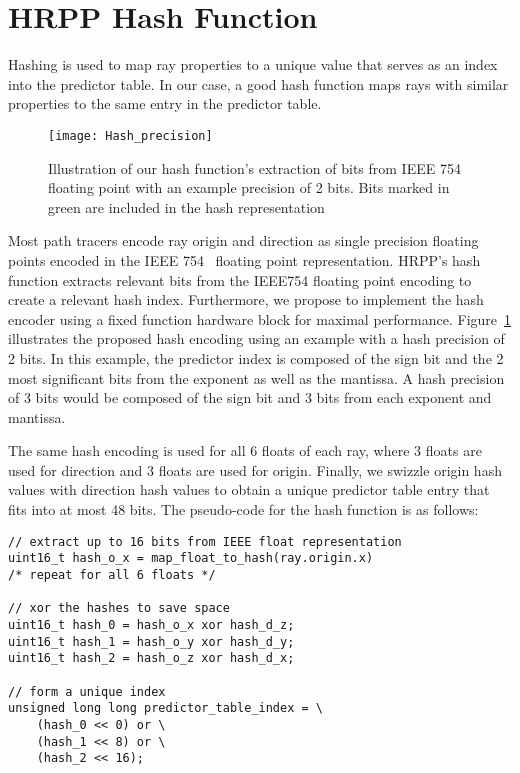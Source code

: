 
\section{HRPP Hash Function} \label{hash}
Hashing is used to map ray properties to a unique value that serves as an index into the predictor table. In our case, a good hash function maps rays with similar properties to the same entry in the predictor table.

\begin{figure}[htb]
  \centering
  \texttt{[image: Hash\_precision]}
 
  \caption{\label{fig:IEEEmapping}
           Illustration of our hash function's extraction of bits from IEEE 754 floating point with an example precision of 2 bits. Bits marked in green are included in the hash representation}
\end{figure}

Most path tracers encode ray origin and direction as single precision floating points encoded in the IEEE 754~\cite{1985--ieee754} floating point representation. HRPP's hash function extracts relevant bits from the IEEE754 floating point encoding to create a relevant hash index. 
Furthermore, we propose to implement the hash encoder using a fixed function hardware block for maximal performance. Figure~\ref{fig:IEEEmapping} illustrates the proposed hash encoding using an example with a hash precision of 2 bits. In this example, the predictor index is composed of the sign bit and the 2 most significant bits from the exponent as well as the mantissa. A hash precision of 3 bits would be composed of the sign bit and 3 bits from each exponent and mantissa. 

The same hash encoding is used for all 6 floats of each ray, where 3 floats are used for direction and 3 floats are used for origin. Finally, we swizzle origin hash values with direction hash values to obtain a unique predictor table entry that fits into at most 48 bits. The pseudo-code for the hash function is as follows:

\begin{verbatim}
// extract up to 16 bits from IEEE float representation 
uint16_t hash_o_x = map_float_to_hash(ray.origin.x)
/* repeat for all 6 floats */

// xor the hashes to save space
uint16_t hash_0 = hash_o_x xor hash_d_z;
uint16_t hash_1 = hash_o_y xor hash_d_y;
uint16_t hash_2 = hash_o_z xor hash_d_x;

// form a unique index
unsigned long long predictor_table_index = \
    (hash_0 << 0) or \
    (hash_1 << 8) or \ 
    (hash_2 << 16);
\end{verbatim}


